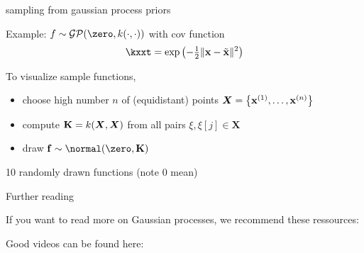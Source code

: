 \documentclass[11pt,compress,t,notes=noshow, xcolor=table]{beamer}
\begin{document}
\begin{framei}[sep=L]{sampling from gaussian process priors}
\item Example: $f \sim \GPzk$ with cov function
$$ \kxxt = \exp\left(-\tfrac{1}{2}\xxtnorm^2\right)$$
\item To visualize sample functions, 
\begin{itemize}
\item choose high number $n$ of (equidistant) points $\bm{X} = \left\{ \mathbf{x}^{(1)}, \ldots, \mathbf{x}^{(n)}\right\}$
  \item compute $\mathbf{K} = k(\bm{X}, \bm{X})$ from all pairs $\xi, \xi[j] \in \bm{X}$ 
  \item draw $\fv \sim \Nzk$ 
\end{itemize}
\item 10 randomly drawn functions (note 0 mean)
\vfill
{}
\end{framei}

\begin{framei}[sep=L]{Further reading}

\item If you want to read more on Gaussian processes, we recommend these ressources: 

\item Good videos can be found here:



\end{framei}
\endlecture
\end{document}

